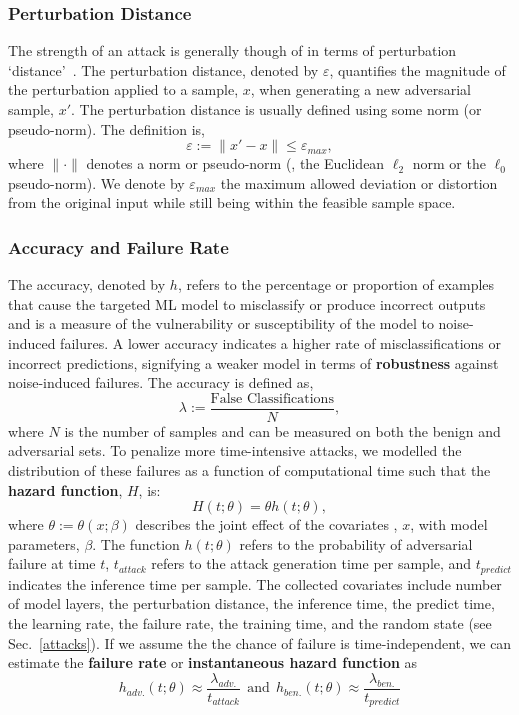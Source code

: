\subsubsection{Perturbation Distance}

\label{perturbation_distance}
The strength of an attack is generally though of in terms of perturbation `distance'~\citep{croce_reliable_2020,chakraborty_adversarial_2018,pixelattack}. The perturbation distance, denoted by $\varepsilon$, quantifies the magnitude of the perturbation applied to a sample, $x$, when generating a new adversarial sample, $x'$. The perturbation distance is usually defined using some norm (or pseudo-norm). The definition is,
\[
    \varepsilon := \| x' - x \| \leq \varepsilon_{max},
\]
where $\| \cdot \|$ denotes a norm or pseudo-norm (\eg, the Euclidean $\ell_2$ norm or the $\ell_0$ pseudo-norm). We denote by $\varepsilon_{max}$ the maximum allowed deviation or distortion from the original input while still being within the feasible sample space.


\subsubsection{Accuracy and Failure Rate}
The accuracy, denoted by $h$, refers to the percentage or proportion of examples that cause the targeted ML model to misclassify or produce incorrect outputs and is a measure of the vulnerability or susceptibility of the model to noise-induced failures. A lower accuracy indicates a higher rate of misclassifications or incorrect predictions, signifying a weaker model in terms of \textbf{robustness} against noise-induced failures. The accuracy is defined as,
\begin{equation}
    \lambda := \frac{\textrm{False~Classifications}}{N},
    \label{eq:acc}
\end{equation}
where $N$ is the number of samples and can be measured on both the benign and adversarial sets. To penalize more time-intensive attacks, we modelled the distribution of these failures as a function of computational time such that the \textbf{hazard function}, $H$, is:
\begin{equation}
    H(t; \theta) =  \theta h(t; \theta),
\label{eq:cdf}
\end{equation}
where $\theta := \theta(x;\beta)$ describes the joint effect of the covariates , ${x}$, with model parameters, ${\beta}$. The function $h(t;\theta)$ refers to the probability of adversarial failure at time $t$, $t_{attack}$ refers to the attack generation time per sample, and $t_{predict}$ indicates the inference time per sample. The collected covariates include number of model layers, the perturbation distance, the inference time, the predict time, the learning rate, the failure rate, the training time, and the random state (see Sec.~\ref{attacks}). If we assume the the chance of failure is time-independent, we can estimate the \textbf{failure rate} or \textbf{instantaneous hazard function} as
\begin{equation}
    h_{adv.}(t; \theta) \approx \frac{\lambda_{adv.}}{t_{attack}}~~\mathrm{and}~~h_{ben.}(t; \theta) \approx \frac{\lambda_{ben.}}{t_{predict}}
    \label{eq:failure_rate}
\end{equation}
